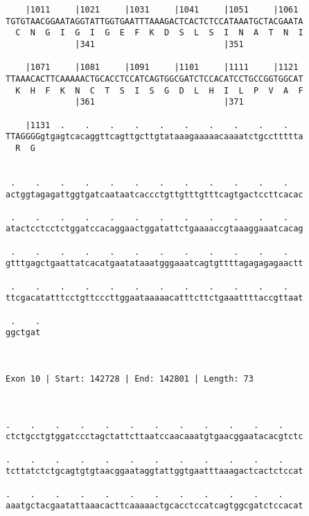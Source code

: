 \documentclass{article}
\begin{document}
\begin{Verbatim}
    |1011     |1021     |1031     |1041     |1051     |1061 
TGTGTAACGGAATAGGTATTGGTGAATTTAAAGACTCACTCTCCATAAATGCTACGAATA
  C  N  G  I  G  I  G  E  F  K  D  S  L  S  I  N  A  T  N  I
              |341                          |351            
  
    |1071     |1081     |1091     |1101     |1111     |1121 
TTAAACACTTCAAAAACTGCACCTCCATCAGTGGCGATCTCCACATCCTGCCGGTGGCAT
  K  H  F  K  N  C  T  S  I  S  G  D  L  H  I  L  P  V  A  F
              |361                          |371            
  
    |1131  .    .    .    .    .    .    .    .    .    .   
TTAGGGGgtgagtcacaggttcagttgcttgtataaagaaaaacaaaatctgccttttta
  R  G                                                      
                                                            
  
 .    .    .    .    .    .    .    .    .    .    .    .   
actggtagagattggtgatcaataatcaccctgttgtttgtttcagtgactccttcacac
                                                            
 .    .    .    .    .    .    .    .    .    .    .    .   
atactcctcctctggatccacaggaactggatattctgaaaaccgtaaaggaaatcacag
                                                            
 .    .    .    .    .    .    .    .    .    .    .    .   
gtttgagctgaattatcacatgaatataaatgggaaatcagtgttttagagagagaactt
                                                            
 .    .    .    .    .    .    .    .    .    .    .    .   
ttcgacatatttcctgttcccttggaataaaaacatttcttctgaaattttaccgttaat
                                                            
 .    .
ggctgat
       
       
 
Exon 10 | Start: 142728 | End: 142801 | Length: 73



.    .    .    .    .    .    .    .    .    .    .    .    
ctctgcctgtggatccctagctattcttaatccaacaaatgtgaacggaatacacgtctc
                                                            
.    .    .    .    .    .    .    .    .    .    .    .    
tcttatctctgcagtgtgtaacggaataggtattggtgaatttaaagactcactctccat
                                                            
.    .    .    .    .    .    .    .    .    .    .    .    
aaatgctacgaatattaaacacttcaaaaactgcacctccatcagtggcgatctccacat
                                                            

\end{Verbatim}
\end{document}
